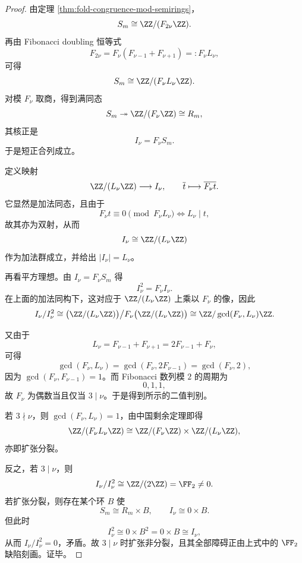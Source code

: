 \begin{proof}
由定理 \ref{thm:fold-congruence-mod-semirings}，
\[
S_m\cong \ZZ/(F_{2\nu}\ZZ).
\]
再由 Fibonacci doubling 恒等式
\[
F_{2\nu}=F_\nu(F_{\nu-1}+F_{\nu+1})=:F_\nu L_\nu,
\]
可得
\[
S_m\cong \ZZ/(F_\nu L_\nu\ZZ).
\]
对模 \(F_\nu\) 取商，得到满同态
\[
S_m\twoheadrightarrow \ZZ/(F_\nu\ZZ)\cong R_m,
\]
其核正是
\[
I_\nu=F_\nu S_m.
\]
于是短正合列成立。

定义映射
\[
\ZZ/(L_\nu\ZZ)\longrightarrow I_\nu,
\qquad
\overline t\longmapsto \overline{F_\nu t}.
\]
它显然是加法同态，且由于
\[
F_\nu t\equiv 0\pmod{F_\nu L_\nu}
\iff
L_\nu\mid t,
\]
故其亦为双射，从而
\[
I_\nu\cong \ZZ/(L_\nu\ZZ)
\]
作为加法群成立，并给出 \(|I_\nu|=L_\nu\)。

再看平方理想。由 \(I_\nu=F_\nu S_m\) 得
\[
I_\nu^2=F_\nu I_\nu.
\]
在上面的加法同构下，这对应于 \(\ZZ/(L_\nu\ZZ)\) 上乘以 \(F_\nu\) 的像，因此
\[
I_\nu/I_\nu^2
\cong
\bigl(\ZZ/(L_\nu\ZZ)\bigr)\big/F_\nu\bigl(\ZZ/(L_\nu\ZZ)\bigr)
\cong
\ZZ/\gcd(F_\nu,L_\nu)\ZZ.
\]

又由于
\[
L_\nu=F_{\nu-1}+F_{\nu+1}=2F_{\nu-1}+F_\nu,
\]
可得
\[
\gcd(F_\nu,L_\nu)
=
\gcd(F_\nu,2F_{\nu-1})
=
\gcd(F_\nu,2),
\]
因为 \(\gcd(F_\nu,F_{\nu-1})=1\)。而 Fibonacci 数列模 \(2\) 的周期为
\[
0,1,1,
\]
故 \(F_\nu\) 为偶数当且仅当 \(3\mid \nu\)。于是得到所示的二值判别。

若 \(3\nmid \nu\)，则 \(\gcd(F_\nu,L_\nu)=1\)，由中国剩余定理即得
\[
\ZZ/(F_\nu L_\nu\ZZ)\cong \ZZ/(F_\nu\ZZ)\times \ZZ/(L_\nu\ZZ),
\]
亦即扩张分裂。

反之，若 \(3\mid \nu\)，则
\[
I_\nu/I_\nu^2\cong \ZZ/(2\ZZ)=\FF_2\neq 0.
\]
若扩张分裂，则存在某个环 \(B\) 使
\[
S_m\cong R_m\times B,
\qquad
I_\nu\cong 0\times B.
\]
但此时
\[
I_\nu^2\cong 0\times B^2=0\times B\cong I_\nu,
\]
从而 \(I_\nu/I_\nu^2=0\)，矛盾。故 \(3\mid \nu\) 时扩张非分裂，且其全部障碍正由上式中的 \(\FF_2\) 缺陷刻画。证毕。
\end{proof}

